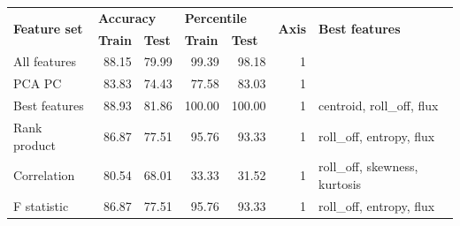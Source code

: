 \begin{table}[h]
\begin{adjustbox}{width=\textwidth}
\begin{tabular}{|l|rr|rr|r|l|}
\hline
\multirow{2}{*}{\textbf{Feature set}} & \multicolumn{2}{l|}{\textbf{Accuracy}}                                   & \multicolumn{2}{l|}{\textbf{Percentile}}                 & \multicolumn{1}{l|}{\multirow{2}{*}{\textbf{Axis}}} & \multirow{2}{*}{\textbf{Best features}} \\ \cline{2-5}
                                      & \multicolumn{1}{l|}{\textbf{Train}} & \multicolumn{1}{l|}{\textbf{Test}} & \multicolumn{1}{l|}{\textbf{Train}} & \multicolumn{1}{l|}{\textbf{Test}} & \multicolumn{1}{l|}{}                               &                                         \\ \hline
All features                          & \multicolumn{1}{r|}{88.15}          & 79.99                              & \multicolumn{1}{r|}{99.39}          & 98.18                              & 1                                                   &                                         \\ \hline
PCA PC                                & \multicolumn{1}{r|}{83.83}          & 74.43                              & \multicolumn{1}{r|}{77.58}          & 83.03                              & 1                                                   &                                         \\ \hline
Best features                         & \multicolumn{1}{r|}{88.93}          & 81.86                              & \multicolumn{1}{r|}{100.00}         & 100.00                             & 1                                                   & centroid, roll\_off, flux               \\ \hline
Rank product                          & \multicolumn{1}{r|}{86.87}          & 77.51                              & \multicolumn{1}{r|}{95.76}          & 93.33                              & 1                                                   & roll\_off, entropy, flux                \\ \hline
Correlation                           & \multicolumn{1}{r|}{80.54}          & 68.01                              & \multicolumn{1}{r|}{33.33}          & 31.52                              & 1                                                   & roll\_off, skewness, kurtosis           \\ \hline
F statistic                           & \multicolumn{1}{r|}{86.87}          & 77.51                              & \multicolumn{1}{r|}{95.76}          & 93.33                              & 1                                                   & roll\_off, entropy, flux                \\ \hline

\end{tabular}
\end{adjustbox}
\end{table}
